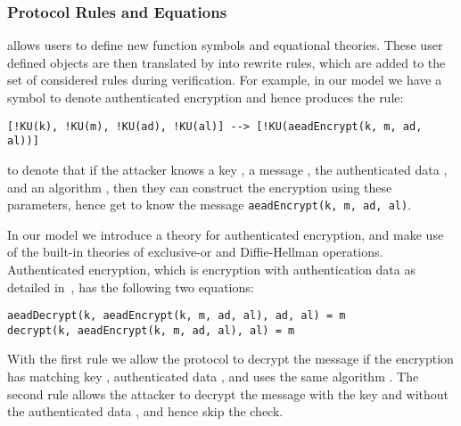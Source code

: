
\spacehack
\subsubsection{Protocol Rules and Equations}
\mTamarin{} allows users to define new function symbols and equational theories.
These user defined objects are then translated by \mTamarin{} into rewrite
rules, which are added to the set of considered rules during verification.
For example, in our model we have a symbol to denote authenticated encryption and
hence \mTamarin{} produces the rule:
%
\begin{lstlisting}
[!KU(k), !KU(m), !KU(ad), !KU(al)] --> [!KU(aeadEncrypt(k, m, ad, al))]
\end{lstlisting}
%
to denote that if the attacker knows a key , a message , the
authenticated data , and an algorithm , then they can construct
the encryption using these parameters, hence get to know the message
\lstinline{aeadEncrypt(k, m, ad, al)}.

In our model we introduce a theory for authenticated encryption, and make use of
the built-in theories of exclusive-or and Diffie-Hellman operations.
%
Authenticated encryption, which is encryption with authentication data as
detailed in~\cite{aead}, has the following two equations:
\begin{lstlisting}
aeadDecrypt(k, aeadEncrypt(k, m, ad, al), ad, al) = m
decrypt(k, aeadEncrypt(k, m, ad, al), al) = m
\end{lstlisting}
With the first rule we allow the protocol to decrypt the message  if the
encryption has matching key , authenticated data , and uses the
same algorithm .
%
The second rule allows the attacker to decrypt the message  with the key
 and without the authenticated data , and hence skip the check.

